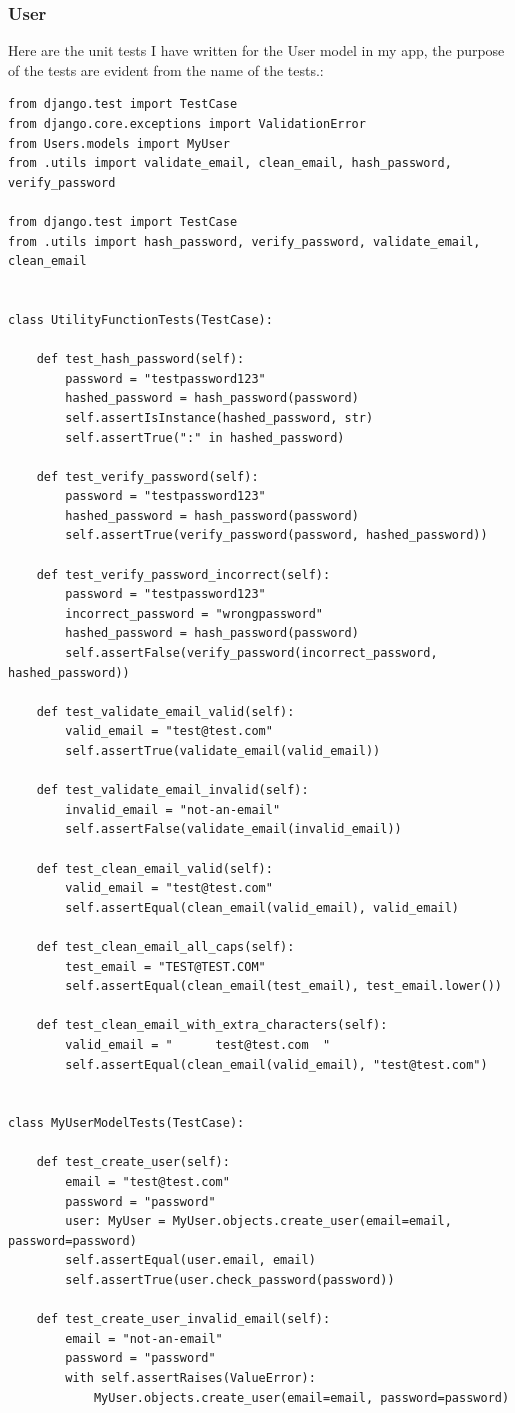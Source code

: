 \subsubsection{User}
Here are the unit tests I have written for the User model in my app, the purpose of the tests are evident from the name of the tests.:
\begin{verbatim}
from django.test import TestCase
from django.core.exceptions import ValidationError
from Users.models import MyUser
from .utils import validate_email, clean_email, hash_password, verify_password

from django.test import TestCase
from .utils import hash_password, verify_password, validate_email, clean_email


class UtilityFunctionTests(TestCase):

    def test_hash_password(self):
        password = "testpassword123"
        hashed_password = hash_password(password)
        self.assertIsInstance(hashed_password, str)
        self.assertTrue(":" in hashed_password)

    def test_verify_password(self):
        password = "testpassword123"
        hashed_password = hash_password(password)
        self.assertTrue(verify_password(password, hashed_password))

    def test_verify_password_incorrect(self):
        password = "testpassword123"
        incorrect_password = "wrongpassword"
        hashed_password = hash_password(password)
        self.assertFalse(verify_password(incorrect_password, hashed_password))

    def test_validate_email_valid(self):
        valid_email = "test@test.com"
        self.assertTrue(validate_email(valid_email))

    def test_validate_email_invalid(self):
        invalid_email = "not-an-email"
        self.assertFalse(validate_email(invalid_email))

    def test_clean_email_valid(self):
        valid_email = "test@test.com"
        self.assertEqual(clean_email(valid_email), valid_email)

    def test_clean_email_all_caps(self):
        test_email = "TEST@TEST.COM"
        self.assertEqual(clean_email(test_email), test_email.lower())

    def test_clean_email_with_extra_characters(self):
        valid_email = "      test@test.com  "
        self.assertEqual(clean_email(valid_email), "test@test.com")


class MyUserModelTests(TestCase):

    def test_create_user(self):
        email = "test@test.com"
        password = "password"
        user: MyUser = MyUser.objects.create_user(email=email, password=password)
        self.assertEqual(user.email, email)
        self.assertTrue(user.check_password(password))

    def test_create_user_invalid_email(self):
        email = "not-an-email"
        password = "password"
        with self.assertRaises(ValueError):
            MyUser.objects.create_user(email=email, password=password)
\end{verbatim}

